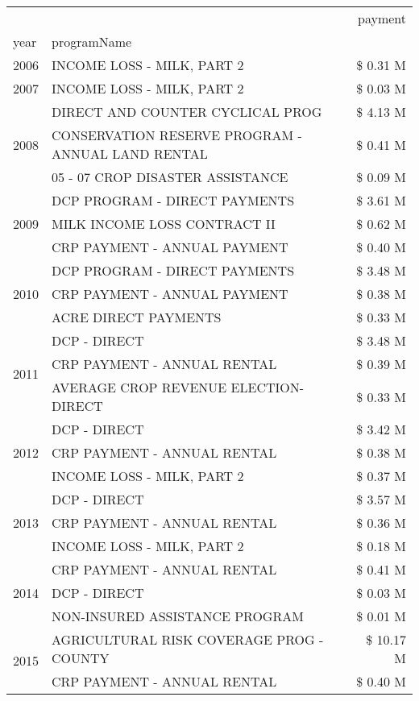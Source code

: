 \begin{tabular}{llr}
\toprule
 &  & payment \\
year & programName &  \\
\midrule
2006 & INCOME LOSS - MILK, PART 2 & \$ 0.31 M \\
\cline{1-3}
2007 & INCOME LOSS - MILK, PART 2 & \$ 0.03 M \\
\cline{1-3}
\multirow[t]{3}{*}{2008} & DIRECT AND COUNTER CYCLICAL PROG & \$ 4.13 M \\
 & CONSERVATION RESERVE PROGRAM - ANNUAL LAND RENTAL & \$ 0.41 M \\
 & 05 - 07 CROP DISASTER ASSISTANCE & \$ 0.09 M \\
\cline{1-3}
\multirow[t]{3}{*}{2009} & DCP PROGRAM - DIRECT PAYMENTS & \$ 3.61 M \\
 & MILK INCOME LOSS CONTRACT II & \$ 0.62 M \\
 & CRP PAYMENT - ANNUAL PAYMENT & \$ 0.40 M \\
\cline{1-3}
\multirow[t]{3}{*}{2010} & DCP PROGRAM - DIRECT PAYMENTS & \$ 3.48 M \\
 & CRP PAYMENT - ANNUAL PAYMENT & \$ 0.38 M \\
 & ACRE DIRECT PAYMENTS & \$ 0.33 M \\
\cline{1-3}
\multirow[t]{3}{*}{2011} & DCP - DIRECT & \$ 3.48 M \\
 & CRP PAYMENT - ANNUAL RENTAL & \$ 0.39 M \\
 & AVERAGE CROP REVENUE ELECTION-DIRECT & \$ 0.33 M \\
\cline{1-3}
\multirow[t]{3}{*}{2012} & DCP - DIRECT & \$ 3.42 M \\
 & CRP PAYMENT - ANNUAL RENTAL & \$ 0.38 M \\
 & INCOME LOSS - MILK, PART 2 & \$ 0.37 M \\
\cline{1-3}
\multirow[t]{3}{*}{2013} & DCP - DIRECT & \$ 3.57 M \\
 & CRP PAYMENT - ANNUAL RENTAL & \$ 0.36 M \\
 & INCOME LOSS - MILK, PART 2 & \$ 0.18 M \\
\cline{1-3}
\multirow[t]{3}{*}{2014} & CRP PAYMENT - ANNUAL RENTAL & \$ 0.41 M \\
 & DCP - DIRECT & \$ 0.03 M \\
 & NON-INSURED ASSISTANCE PROGRAM & \$ 0.01 M \\
\cline{1-3}
\multirow[t]{3}{*}{2015} & AGRICULTURAL RISK COVERAGE PROG - COUNTY & \$ 10.17 M \\
 & CRP PAYMENT - ANNUAL RENTAL & \$ 0.40 M \\

\end{tabular}
